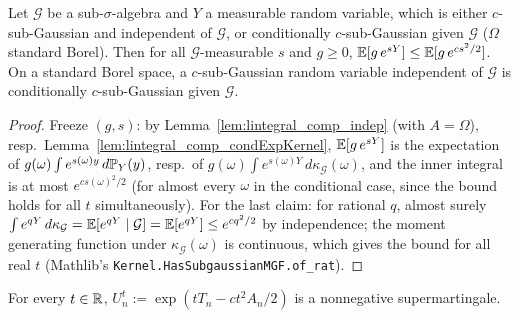 \begin{lemma}
  \label{lem:subg_moment_bound}
  \leanok
  Let $\mathcal G$ be a sub-$\sigma$-algebra and $Y$ a measurable random variable, which is either
  $c$-sub-Gaussian and independent of $\mathcal G$, or conditionally $c$-sub-Gaussian given
  $\mathcal G$ ($\Omega$ standard Borel). Then for all $\mathcal G$-measurable $s$ and $g \ge 0$,
  $\mathbb{E}[g \, e^{sY}] \le \mathbb{E}[g \, e^{cs^2/2}]$. On a standard Borel space, a $c$-sub-Gaussian random
  variable independent of $\mathcal G$ is conditionally $c$-sub-Gaussian given $\mathcal G$.
\end{lemma}

\begin{proof}
  \leanok
  Freeze $(g, s)$: by Lemma~\ref{lem:lintegral_comp_indep} (with $A = \Omega$), resp.\
  Lemma~\ref{lem:lintegral_comp_condExpKernel}, $\mathbb{E}[g \, e^{sY}]$ is the expectation of
  $g(\omega) \int e^{s(\omega) y} \, d\mathbb{P}_Y(y)$, resp.\ of $g(\omega) \int e^{s(\omega) Y} \,
  d\kappa_{\mathcal G}(\omega)$, and the inner integral is at most $e^{c s(\omega)^2/2}$ (for almost
  every $\omega$ in the conditional case, since the bound holds for all $t$ simultaneously). For the
  last claim: for rational $q$, almost surely $\int e^{qY} \, d\kappa_{\mathcal G} = \mathbb{E}[e^{qY} \mid
  \mathcal G] = \mathbb{E}[e^{qY}] \le e^{cq^2/2}$ by independence; the moment generating function under
  $\kappa_{\mathcal G}(\omega)$ is continuous, which gives the bound for all real $t$ (Mathlib's
  \texttt{Kernel.HasSubgaussianMGF.of\_rat}).
\end{proof}

\begin{lemma}
  \label{lem:exp_subg_supermartingale}
  \leanok
  For every $t \in \mathbb{R}$, $U^t_n := \exp(t T_n - c t^2 A_n / 2)$ is a nonnegative supermartingale.
\end{lemma}


